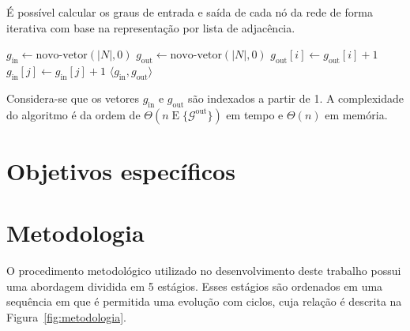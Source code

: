 \begin{algoritmo}
\label{alg:graus}
%
É possível calcular os graus de entrada e saída de cada nó da rede
de forma iterativa com base na representação por lista de adjacência.

\begin{algorithmic}[1]
\STATE{}
\STATE $g_\text{in} \leftarrow \text{novo-vetor}(|N|, 0)$
\STATE $g_\text{out} \leftarrow \text{novo-vetor}(|N|, 0)$
        \STATE{}
        \STATE $g_\text{out}[i] \leftarrow g_\text{out}[i] + 1$
        \STATE $g_\text{in}[j] \leftarrow g_\text{in}[j] + 1$
    \ENDFOR
\ENDFOR
\RETURN $\langle g_\text{in}, g_\text{out} \rangle$
\end{algorithmic}
Considera-se que os vetores $g_\text{in}$ e $g_\text{out}$ são indexados a
partir de 1.
A complexidade do algoritmo é da ordem de 
$\Theta(n\operatorname{E}\{\mathcal{G}^\text{out}\})$ em tempo e $\Theta(n)$ em
memória.
\end{algoritmo}

\section{Objetivos específicos}
\label{sec:2:objetivos}


\section{Metodologia}
\label{sec:2:metodologia}

O procedimento metodológico utilizado no desenvolvimento deste trabalho possui
uma abordagem dividida em 5 estágios.
Esses estágios são ordenados em uma sequência em que é permitida uma evolução
com ciclos, cuja relação é descrita na Figura~\ref{fig:metodologia}.

